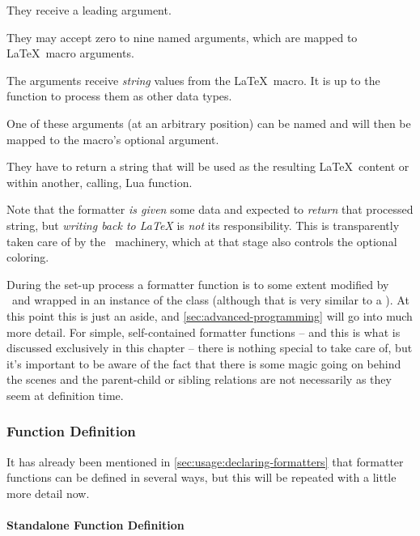 \documentclass[12pt]{scrartcl}
\begin{document}
\begin{itemize*}
\item They receive a leading  argument.
\item They may accept zero to nine named arguments, which are mapped to \LaTeX\
macro arguments.
\item The arguments receive \emph{string} values from the \LaTeX\ macro.  It is up to the function to process them as other data types.
\item One of these arguments (at an arbitrary position) can be named \luavar{options} and will then be mapped to the macro's optional argument.
\item They have to return a string that will be used as the resulting \LaTeX\
content or within another, calling, Lua function.
\end{itemize*}

\noindent Note that the formatter \emph{is given} some data and expected to
\emph{return} that processed string, but \emph{writing back to \LaTeX} is
\emph{not} its responsibility.  This is transparently taken care of by the
\luaformatters\ machinery, which at that stage also controls the optional
coloring.

During the set-up process a formatter function is to some extent modified by
\luaformatters\ and wrapped in an instance of the 
class (although that is very similar to a \term{Formatter Entry Table}). At this
point this is just an aside, and \vref{sec:advanced-programming} will go into
much more detail.  For simple, self-contained formatter functions  -- and this
is what is discussed exclusively in this chapter -- there is nothing special to
take care of, but it's important to be aware of the fact that there is some
magic going on behind the scenes and the parent-child or sibling relations are
not necessarily as they seem at definition time.


\subsubsection{Function Definition}
\label{sec:defining-function-definition}

It has already been mentioned in \vref{sec:usage:declaring-formatters} that formatter functions can be defined in several ways, but this will be repeated with a little more detail now.


\paragraph{Standalone Function Definition}
\end{document}
